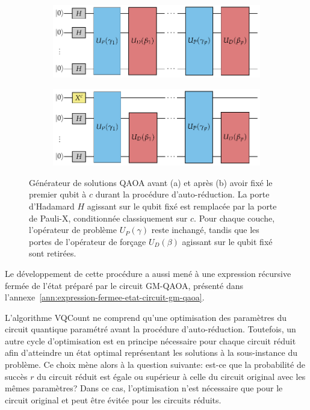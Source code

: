 \begin{figure}[h]
    \centering
    \begin{subfigure}[h]{0.7\textwidth}
        \centering
        \caption{}
        \includegraphics[width=1\textwidth]{figures/qaoa-self-reducibility-1.pdf}
        \label{fig:vqcount-circuit-a}
    \end{subfigure}
    \begin{subfigure}[h]{0.7\textwidth}
        \centering
        \caption{}
        \includegraphics[width=1\textwidth]{figures/qaoa-self-reducibility-2.pdf}
        \label{fig:vqcount-circuit-b}
    \end{subfigure}
    \caption[Procédure d'auto-réduction de VQCount]{Générateur de solutions QAOA avant (a) et après (b) avoir fixé le premier qubit à $c$ durant la procédure d'auto-réduction. La porte d'Hadamard $H$ agissant sur le qubit fixé est remplacée par la porte de Pauli-X, conditionnée classiquement sur $c$. Pour chaque couche, l'opérateur de problème $U_{P}(\gamma)$ reste inchangé, tandis que les portes de l'opérateur de forçage $U_{D}(\beta)$ agissant sur le qubit fixé sont retirées.}
    \label{fig:vqcount-circuit} 
\end{figure}

Le développement de cette procédure a aussi mené à une expression récursive fermée de l'état préparé par le circuit GM-QAOA, présenté dans l'annexe~\ref{ann:expression-fermee-etat-circuit-gm-qaoa}.

L'algorithme VQCount ne comprend qu'une optimisation des paramètres du circuit quantique paramétré avant la procédure d'auto-réduction. Toutefois, un autre cycle d'optimisation est en principe nécessaire pour chaque circuit réduit afin d'atteindre un état optimal représentant les solutions à la sous-instance du problème. Ce choix mène alors à la question suivante: est-ce que la probabilité de succès $r$ du circuit réduit est égale ou supérieur à celle du circuit original avec les mêmes paramètres? Dans ce cas, l'optimisation n'est nécessaire que pour le circuit original et peut être évitée pour les circuits réduits.

